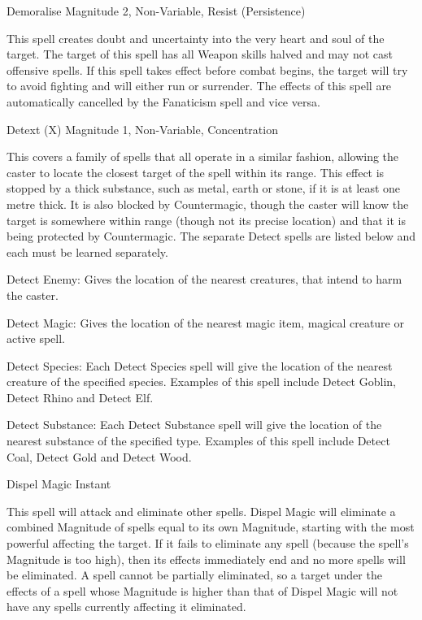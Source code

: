 \begin{rpg-spell}
{Demoralise}
{Magnitude 2, Non-Variable, Resist (Persistence)}

This spell creates doubt and uncertainty into the very heart and soul of the target. The target of this spell has all Weapon skills halved and may not cast offensive spells. If this spell takes effect before combat begins, the target will try to avoid fighting and will either run or surrender. The effects of this spell are automatically cancelled by the Fanaticism spell and vice versa. 
\end{rpg-spell}


\begin{rpg-spell}
{Detext (X)}
{Magnitude 1, Non-Variable, Concentration}

This covers a family of spells that all operate in a similar fashion, allowing the caster to locate the closest target of the spell within its range. This effect is stopped by a thick substance, such as metal, earth or stone, if it is at least one metre thick. It is also blocked by Countermagic, though the caster will know the target is somewhere within range (though not its precise location) and that it is being protected by Countermagic. The separate Detect spells are listed below and each must be learned separately.

\begin{rpg-list}
\item Detect Enemy: Gives the location of the nearest creatures, that intend to harm the caster. 
\item Detect Magic: Gives the location of the nearest magic item, magical creature or active spell. 
\item Detect Species: Each Detect Species spell will give the location of the nearest creature of the specified species. Examples of this spell include Detect Goblin, Detect Rhino and Detect Elf. 
\item Detect Substance: Each Detect Substance spell will give the location of the nearest substance of the specified type. Examples of this spell include Detect Coal, Detect Gold and Detect Wood. 
\end{rpg-list}
\end{rpg-spell}


\begin{rpg-spell}
{Dispel Magic}
{Instant}

This spell will attack and eliminate other spells. Dispel Magic will eliminate a combined Magnitude of spells equal to its own Magnitude, starting with the most powerful affecting the target. If it fails to eliminate any spell (because the spell’s Magnitude is too high), then its effects immediately end and no more spells will be eliminated. A spell cannot be partially eliminated, so a target under the effects of a spell whose Magnitude is higher than that of Dispel Magic will not have any spells currently affecting it eliminated. 
\end{rpg-spell}


